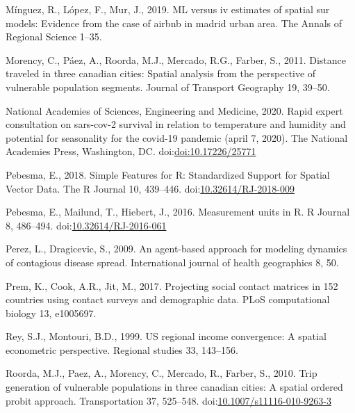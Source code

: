 \documentclass[]{elsarticle} %
\begin{document}
\leavevmode\hypertarget{ref-Minguez2019}{}%
Mínguez, R., López, F., Mur, J., 2019. ML versus iv estimates of spatial
sur models: Evidence from the case of airbnb in madrid urban area. The
Annals of Regional Science 1--35.

\leavevmode\hypertarget{ref-Morency2011distance}{}%
Morency, C., Páez, A., Roorda, M.J., Mercado, R.G., Farber, S., 2011.
Distance traveled in three canadian cities: Spatial analysis from the
perspective of vulnerable population segments. Journal of Transport
Geography 19, 39--50.

\leavevmode\hypertarget{ref-National2020rapid}{}%
National Academies of Sciences, Engineering and Medicine, 2020. Rapid
expert consultation on sars-cov-2 survival in relation to temperature
and humidity and potential for seasonality for the covid-19 pandemic
(april 7, 2020). The National Academies Press, Washington, DC.
doi:\href{https://doi.org/doi:10.17226/25771}{doi:10.17226/25771}

\leavevmode\hypertarget{ref-Pebesma2018}{}%
Pebesma, E., 2018. Simple Features for R: Standardized Support for
Spatial Vector Data. The R Journal 10, 439--446.
doi:\href{https://doi.org/10.32614/RJ-2018-009}{10.32614/RJ-2018-009}

\leavevmode\hypertarget{ref-Pebesma2016}{}%
Pebesma, E., Mailund, T., Hiebert, J., 2016. Measurement units in R. R
Journal 8, 486--494.
doi:\href{https://doi.org/10.32614/RJ-2016-061}{10.32614/RJ-2016-061}

\leavevmode\hypertarget{ref-Perez2009agent}{}%
Perez, L., Dragicevic, S., 2009. An agent-based approach for modeling
dynamics of contagious disease spread. International journal of health
geographics 8, 50.

\leavevmode\hypertarget{ref-Prem2017projecting}{}%
Prem, K., Cook, A.R., Jit, M., 2017. Projecting social contact matrices
in 152 countries using contact surveys and demographic data. PLoS
computational biology 13, e1005697.

\leavevmode\hypertarget{ref-Rey1999us}{}%
Rey, S.J., Montouri, B.D., 1999. US regional income convergence: A
spatial econometric perspective. Regional studies 33, 143--156.

\leavevmode\hypertarget{ref-Roorda2010trip}{}%
Roorda, M.J., Paez, A., Morency, C., Mercado, R., Farber, S., 2010. Trip
generation of vulnerable populations in three canadian cities: A spatial
ordered probit approach. Transportation 37, 525--548.
doi:\href{https://doi.org/10.1007/s11116-010-9263-3}{10.1007/s11116-010-9263-3}
\end{document}
